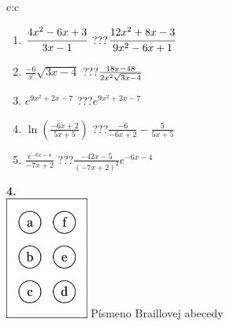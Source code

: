 \documentclass[10pt]{report}
\begin{document}
\begin{tabular}{c:c}
\begin{minipage}[c][104.5mm][t]{0.5\linewidth}
\begin{center}
\begin{minipage}{0.79\linewidth}
\begin{center}
\begin{varwidth}{\linewidth}
\begin{enumerate}
\item $\cfrac{4x^2-6x+3}{3x-1}$\quad \dotfill\; ???\;\dotfill \quad $\cfrac{12x^2+8x-3}{9x^2-6x+1}$
\item $\frac{-6}{x}\sqrt{3x-4}$\quad \dotfill\; ???\;\dotfill \quad $\frac{18x-48}{2x^2 \sqrt{\smash[b]{3x-4}}}$
\item $e^{9x^2+2x-7}$\quad \dotfill\; ???\;\dotfill \quad $e^{9x^2+2x-7}$
\item $\ln{\left(\frac{-6x+2}{5x+5}\right)}$\quad \dotfill\; ???\;\dotfill \quad $\frac{-6}{-6x+2}-\frac{5}{5x+5}$
\item $\frac{e^{-6x-4}}{-7x+2}$\quad \dotfill\; ???\;\dotfill \quad $\frac{-42x-5}{(-7x+2)^2}e^{-6x-4}$
\end{enumerate}
\end{varwidth}
\end{center}
\end{minipage}
\begin{minipage}{0.20\linewidth}
\begin{center}
{\Huge\bfseries 4.} \\[2mm]
\includegraphics[height=40mm]{../images/braille.png}
{\small Písmeno Braillovej abecedy}
\end{center}
\end{minipage}
\end{center}
\end{minipage}
%
\end{tabular}
\newpage
\thispagestyle{empty}
\end{document}
